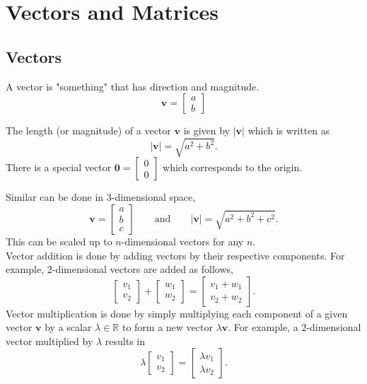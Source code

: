 \documentclass[10pt, a4paper]{article}
\newcommand{\R}{\mathbb{R}}
\begin{document}
\newpage

\section{Vectors and Matrices}

\subsection{Vectors}
A vector is "something" that has direction and magnitude.
\[
\mathbf{v} = 
\begin{bmatrix}
   a \\
   b
\end{bmatrix}
\]

The length (or magnitude) of a vector $\mathbf{v}$ is given by $|\mathbf{v}|$ which is written as
\[
|\mathbf{v}| = \sqrt{a ^ 2 + b ^ 2}.
\]
There is a special vector ${\mathbf{0}}=\begin{bmatrix} 0 \\ 0 \end{bmatrix}$ which corresponds to the origin.

Similar can be done in $3$-dimensional space,
\[
\mathbf{v} = 
\begin{bmatrix}
a \\
b \\
c
\end{bmatrix}
\qquad\text{and}\qquad|\mathbf{v}| = \sqrt{a ^ 2 + b ^ 2 + c ^ 2}.
\]
This can be scaled up to $n$-dimensional vectors for any $n$. \\

Vector addition is done by adding vectors by their respective components. For example, $2$-dimensional vectors are added as follows,
\[
\begin{bmatrix} v_1 \\ v_2 \end{bmatrix} + \begin{bmatrix} w_1 \\ w_2 \end{bmatrix} = \begin{bmatrix} v_1 + w_1 \\ v_2 + w_2 \end{bmatrix}.
\]
Vector multiplication is done by simply multiplying each component of a given vector $\mathbf{v}$ by a scalar $\lambda \in \R$ to form a new vector $\lambda\mathbf{v}$. For example, a $2$-dimensional vector multiplied by $\lambda$ results in
\[
\lambda\begin{bmatrix} v_1 \\ v_2 \end{bmatrix} = \begin{bmatrix} \lambda v_1 \\ \lambda v_2 \end{bmatrix}.
\]
\end{document}
